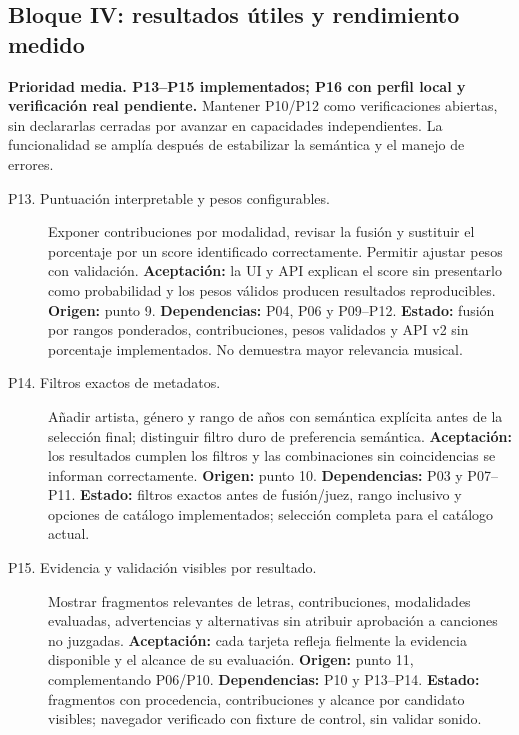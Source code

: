\subsection{Bloque IV: resultados útiles y rendimiento medido}
\textbf{Prioridad media. P13--P15 implementados; P16 con perfil local y verificación real pendiente.}
Mantener P10/P12 como verificaciones abiertas, sin declararlas cerradas por
avanzar en capacidades independientes. La funcionalidad se amplía después de estabilizar la
semántica y el manejo de errores.

\begin{description}
\item[P13. Puntuación interpretable y pesos configurables.]
Exponer contribuciones por modalidad, revisar la fusión y sustituir el porcentaje
por un score identificado correctamente. Permitir ajustar pesos con validación.
\textbf{Aceptación:} la UI y API explican el score sin presentarlo como
probabilidad y los pesos válidos producen resultados reproducibles.
\textbf{Origen:} punto 9. \textbf{Dependencias:} P04, P06 y P09--P12.
\textbf{Estado:} fusión por rangos ponderados, contribuciones, pesos validados
y API v2 sin porcentaje implementados. No demuestra mayor relevancia musical.

\item[P14. Filtros exactos de metadatos.]
Añadir artista, género y rango de años con semántica explícita antes de la
selección final; distinguir filtro duro de preferencia semántica.
\textbf{Aceptación:} los resultados cumplen los filtros y las combinaciones
sin coincidencias se informan correctamente.
\textbf{Origen:} punto 10. \textbf{Dependencias:} P03 y P07--P11.
\textbf{Estado:} filtros exactos antes de fusión/juez, rango inclusivo y opciones
de catálogo implementados; selección completa para el catálogo actual.

\item[P15. Evidencia y validación visibles por resultado.]
Mostrar fragmentos relevantes de letras, contribuciones, modalidades evaluadas,
advertencias y alternativas sin atribuir aprobación a canciones no juzgadas.
\textbf{Aceptación:} cada tarjeta refleja fielmente la evidencia disponible y
el alcance de su evaluación. \textbf{Origen:} punto 11, complementando P06/P10.
\textbf{Dependencias:} P10 y P13--P14.
\textbf{Estado:} fragmentos con procedencia, contribuciones y alcance por
candidato visibles; navegador verificado con fixture de control, sin validar sonido.


\end{description}
